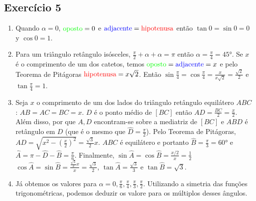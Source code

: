\subsection{Exercício 5}

\begin{enumerate}
\item Quando $\alpha=0$, ${\color{green}{\text{oposto}}} = 0$ e
  ${\color{blue}{\text{adjacente}}} = \text{\color{red}{\text{hipotenusa}}}$
  então ${\tan 0} = {\sin 0} = 0$ y $\cos 0 = 1$.
\item Para um triângulo retângulo isósceles,
  $\frac{\pi}{2} + \alpha + \alpha = \pi$
  então $\alpha = \frac{\pi}{4} = 45°$.
  Se $x$ é o comprimento de um dos catetos,
  temos ${\color{green}{\text{oposto}}} = {\color{blue}{\text{adjacente}}} = x$
  e pelo Teorema de Pitágoras
  $\text{\color{red}{\text{hipotenusa}}} = x \sqrt{2} $.
  Então $\sin \frac{\pi}{4} = \cos \frac{\pi}{4} = \frac{x}{x \sqrt{2}} = \frac{\sqrt{2}}{2}$
  e $\tan \frac{\pi}{4} = 1$.
\item Seja $x$ o comprimento de um dos lados do triângulo retângulo equilátero
  $ABC$: ${AB} = {AC} = {BC} = x$.
  $D$ é o ponto médio de $[BC]$ então ${AD} = \frac{BC}{2} = \frac{x}{2}$.
  Além disso, por que $A, D$ encontram-se sobre a mediatriz de $[BC]$ e
  $ABD$ é retângulo em $D$ (que é o mesmo que $\widehat{D} = \frac{\pi}{2}$).
  Pelo Teorema de Pitágoras,
  $AD = \sqrt{x^2 - \left(\frac{x}{2}\right)^2} = \frac{\sqrt{3}}{2} x$.
  $ABC$ é equilátero e portanto $\widehat{B} = \frac{\pi}{3} = 60°$ e
  $\widehat{A} = \pi - \widehat{D} - \widehat{B} = \frac{\pi}{6}$.
  Finalmente, 
  $\sin \widehat{A} = \cos \widehat{B} = \frac{x/2}{x} = \frac{1}{2}$
  $\cos \widehat{A} = \sin \widehat{B} = \frac{\frac{\sqrt{3}}{2} x}{x} =
  \frac{\sqrt{3}}{2}$,
  $\tan \widehat{A} = \frac{\sqrt{3}}{3}$ e
  $\tan \widehat{B} = \sqrt{3}$.
\item Já obtemos os valores para
  $\alpha = 0, \frac{\pi}{6}, \frac{\pi}{4}, \frac{\pi}{3}, \frac{\pi}{2}$.
  Utilizando a simetria das funções trigonométricas,
  podemos deduzir os valore para os múltiplos desses ângulos.


\end{enumerate}
